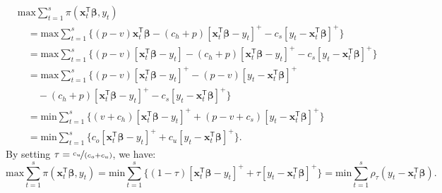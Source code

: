 \documentclass{article}
\begin{document}
\[
    \begin{aligned}
        &\text{max}\displaystyle\sum_{t=1}^s{\pi(\mathbf{x}_t^{\mathsf{T}}\boldsymbol{\beta},y_t)}\\
        &\quad=\text{max}\displaystyle\sum_{t=1}^s\{(p-v)\mathbf{x}_t^{\mathsf{T}}\boldsymbol{\beta}-(c_h+p)[\mathbf{x}_t^{\mathsf{T}}\boldsymbol{\beta}-y_t]^+-c_s[y_t-\mathbf{x}_t^{\mathsf{T}}\boldsymbol{\beta}]^+\}\\
        &\quad=\text{max}\displaystyle\sum_{t=1}^s\{(p-v)[\mathbf{x}_t^{\mathsf{T}}\boldsymbol{\beta}-y_t]-(c_h+p)[\mathbf{x}_t^{\mathsf{T}}\boldsymbol{\beta}-y_t]^+-c_s[y_t-\mathbf{x}_t^{\mathsf{T}}\boldsymbol{\beta}]^+\}\\
        &\quad=\text{max}\displaystyle\sum_{t=1}^s\{(p-v)[\mathbf{x}_t^{\mathsf{T}}\boldsymbol{\beta}-y_t]^+-(p-v)[y_t-\mathbf{x}_t^{\mathsf{T}}\boldsymbol{\beta}]^+\\
        &\qquad-(c_h+p)[\mathbf{x}_t^{\mathsf{T}}\boldsymbol{\beta}-y_t]^+-c_s[y_t-\mathbf{x}_t^{\mathsf{T}}\boldsymbol{\beta}]^+\}\\
        &\quad=\text{min}\displaystyle\sum_{t=1}^s\{(v+c_h)[\mathbf{x}_t^{\mathsf{T}}\boldsymbol{\beta}-y_t]^++(p-v+c_s)[y_t-\mathbf{x}_t^{\mathsf{T}}\boldsymbol{\beta}]^+\}\\
        &\quad=\text{min}\displaystyle\sum_{t=1}^s\{c_o[\mathbf{x}_t^{\mathsf{T}}\boldsymbol{\beta}-y_t]^++c_u[y_t-\mathbf{x}_t^{\mathsf{T}}\boldsymbol{\beta}]^+\}.
    \end{aligned}
\]
By setting $\tau=\nicefrac{c_u}{(c_o+c_u)}$, we have:
\[
    \text{max}\displaystyle\sum_{t=1}^s{\pi(\mathbf{x}_t^{\mathsf{T}}\boldsymbol{\beta},y_t)}=\text{min}\displaystyle\sum_{t=1}^s\{(1-\tau)[\mathbf{x}_t^{\mathsf{T}}\boldsymbol{\beta}-y_t]^++\tau[y_t-\mathbf{x}_t^{\mathsf{T}}\boldsymbol{\beta}]^+\}=\text{min}\displaystyle\sum_{t=1}^s\rho_{\tau}(y_t-\mathbf{x}_t^{\mathsf{T}}\boldsymbol{\beta}).
\]
\end{document}
